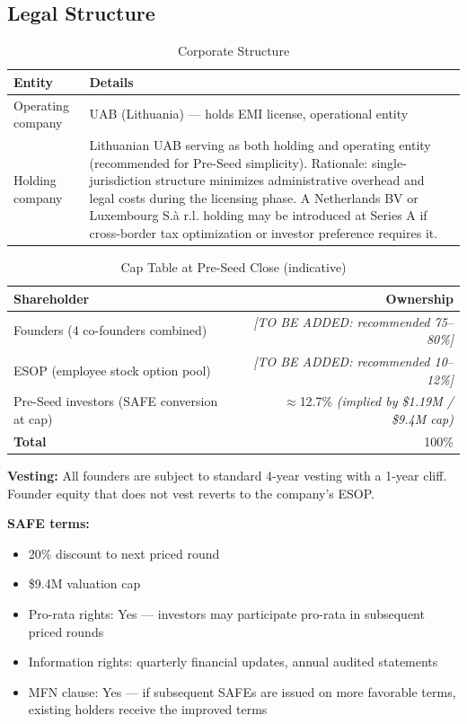 \documentclass[11pt,a4paper]{article}
\begin{document}
\subsection*{Legal Structure}
\label{sec:legal_structure}

\begin{table}[htbp]
\centering
\caption{Corporate Structure}
\begin{tabularx}{\linewidth}{@{}lX@{}}
\toprule
\textbf{Entity} & \textbf{Details} \\
\midrule
Operating company   & UAB (Lithuania) --- holds EMI license, operational entity \\
Holding company     & Lithuanian UAB serving as both holding and operating entity (recommended for Pre-Seed simplicity). Rationale: single-jurisdiction structure minimizes administrative overhead and legal costs during the licensing phase. A Netherlands BV or Luxembourg S.à r.l. holding may be introduced at Series A if cross-border tax optimization or investor preference requires it. \\
\bottomrule
\end{tabularx}
\end{table}

\begin{table}[htbp]
\centering
\caption{Cap Table at Pre-Seed Close (indicative)}
\begin{tabularx}{\linewidth}{@{}Xr@{}}
\toprule
\textbf{Shareholder} & \textbf{Ownership} \\
\midrule
Founders (4 co-founders combined) & \textit{[TO BE ADDED: recommended 75--80\%]} \\
ESOP (employee stock option pool) & \textit{[TO BE ADDED: recommended 10--12\%]} \\
Pre-Seed investors (SAFE conversion at cap) & $\approx$12.7\% \textit{(implied by \$1.19M / \$9.4M cap)} \\
\midrule
\textbf{Total}                    & 100\% \\
\bottomrule
\end{tabularx}
\end{table}

\noindent\textbf{Vesting:} All founders are subject to standard 4-year vesting with a 1-year cliff. Founder equity that does not vest reverts to the company's ESOP.

\noindent\textbf{SAFE terms:}
\begin{itemize}[leftmargin=2em, itemsep=2pt, parsep=0pt]
\item 20\% discount to next priced round
\item \$9.4M valuation cap
\item Pro-rata rights: Yes --- investors may participate pro-rata in subsequent priced rounds
\item Information rights: quarterly financial updates, annual audited statements
\item MFN clause: Yes --- if subsequent SAFEs are issued on more favorable terms, existing holders receive the improved terms
\end{itemize}
\end{document}

